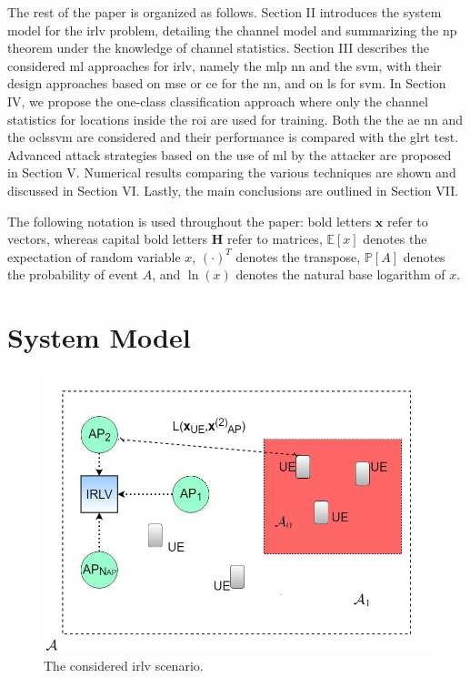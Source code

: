 \documentclass[draftcls,onecolumn,12pt]{IEEEtran}
\begin{document}
{The rest of the paper is organized as follows. Section II introduces the system model for the \ac{irlv} problem, detailing the channel model and summarizing the \ac{np} theorem under the knowledge of channel statistics. Section III describes the considered \ac{ml} approaches for \ac{irlv}, namely the \ac{mlp} \ac{nn} and the \ac{svm}, with their design approaches based on \ac{mse} or \ac{ce} for the \ac{nn}, and on  \ac{ls} for \ac{svm}. In Section IV, we propose the one-class classification approach where only the channel statistics for locations inside the \ac{roi} are used for training. Both the the \ac{ae} \ac{nn} and the \ac{oclssvm} are considered and their performance is compared with the \ac{glrt} test. Advanced attack strategies based on the use of \ac{ml} by the attacker are proposed in Section V. Numerical results comparing the various techniques are shown and discussed in Section VI. Lastly, the main conclusions are outlined in Section VII.

The following notation is used throughout the paper: bold letters $\bm{x}$ refer to vectors, whereas capital bold letters $\bm{H}$ refer to matrices, $\mathbb{E}[x]$ denotes the expectation of random variable $x$, $(\cdot)^T$ denotes the transpose, $\mathbb P[A]$ denotes the probability of event $A$, and $\ln(x)$ denotes the natural base logarithm of $x$.

\section{System Model}

\begin{figure}
    \centering
    \includegraphics[width=0.6\columnwidth]{irlv.jpg}
    \caption{The considered \ac{irlv} scenario.}
    \label{fig1}
\end{figure}

}
\end{document}
